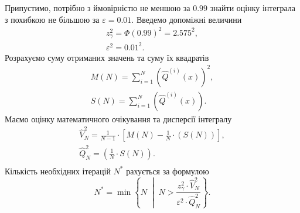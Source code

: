 Припустимо,
потрібно з ймовірністю не меншою за $0.99$
знайти оцінку інтеграла з похибкою не більшою за $\varepsilon = 0.01$.
Введемо допоміжні величини
\begin{equation*}
  \begin{split}
    z^2_{\gamma} = \Phi\left( 0.99 \right)^2 = 2.575^2, \\
    \varepsilon^2 = 0.01^2.
  \end{split}
\end{equation*}
Розрахуємо суму отриманих значень та суму їх квадратів
\begin{equation*}
  \begin{split}
    M\left( N \right) = \sum_{i=1}^{N} \left(
        \hat{Q}^{\left( i \right)}\left( x \right)
      \right)^2, \\
    S\left( N \right) = \sum_{i=1}^{N} \left(
        \hat{Q}^{\left( i \right)}\left( x \right)
      \right).
  \end{split}
\end{equation*}
Маємо оцінку математичного очікування та дисперсії інтегралу
\begin{equation*}
  \begin{split}
    \hat{V}^2_N = \frac{1}{N-1}
      \cdot \left[ M\left( N \right) - \frac{1}{N}
      \cdot \left( S\left( N \right) \right) \right], \\
    \hat{Q}^2_N = \left( \frac{1}{N} \cdot S\left( N \right) \right). \\
  \end{split}
\end{equation*}
Кількість необхідних ітерацій $N^*$ рахується за формулою
\begin{equation*}
  N^* = \min{\left\{ N \;\middle|\;
    N > \frac{z^2_{\gamma} \cdot \hat{V}^2_N}
    {\varepsilon^2 \cdot \hat{Q}^2_N} \right\}}.
\end{equation*}
